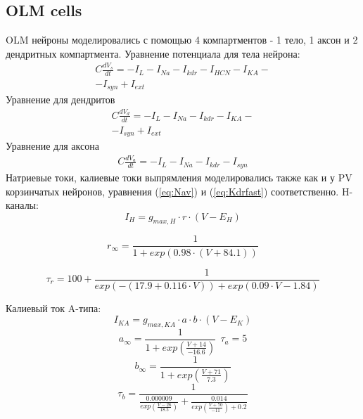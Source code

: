 \documentclass[12pt]{article}
\begin{document}
\subsection{OLM cells}
OLM нейроны моделировались с помощью 4 компартментов - 1 тело, 1 аксон и 2 дендритных компартмента. Уравнение потенциала для тела нейрона:
\begin{eqnarray}
C\frac{dV_s}{dt} = -I_L - I_{Na} - I_{kdr} - I_{HCN} - I_{KA}-
 \nonumber \\
-I_{syn} + I_{ext}
\end{eqnarray}
Уравнение для дендритов
\begin{eqnarray}
C\frac{dV_d}{dt} = -I_L - I_{Na} - I_{kdr} - I_{KA}-
\nonumber \\
-I_{syn} + I_{ext}
\end{eqnarray}
Уравнение для аксона
\begin{eqnarray}
C\frac{dV_a}{dt} = -I_L - I_{Na} - I_{kdr} - I_{syn}
\end{eqnarray}
Натриевые токи, калиевые токи выпрямления моделировались также как и у PV корзинчатых нейронов, уравнения (\ref{eq:Nav}) и (\ref{eq:Kdrfast}) соответственно.
H-каналы:
\begin{equation}
\label{eq:HCNolm}
I_{H} = g_{max, H} \cdot r \cdot (V - E_{H})
\end{equation}

\begin{equation}
r_{\infty} =  \frac{1}{1 + exp(0.98 \cdot(V + 84.1))}
\end{equation}

\begin{equation}
\tau_{r} = 100 + \frac{1}{exp(-(17.9+0.116\cdot V)) + exp(0.09 \cdot V-1.84)   }
\end{equation}

Калиевый ток A-типа:
\begin{equation}
\label{eq:KvAolm}
I_{KA} = g_{max, KA} \cdot a \cdot b \cdot (V - E_K)
\end{equation}
\begin{equation}
a_{\infty} = \frac{1}{1 + exp(\frac{V + 14}{-16.6})  } \ \ \tau_a = 5
\end{equation}
\begin{equation}
b_{\infty} = \frac{1}{1 + exp(\frac{V + 71}{7.3})  }
\end{equation}
\begin{equation}
\tau_b = \frac{1}{\frac{0.000009}{exp(\frac{V - 26}{18.5})}  + \frac{0.014}{exp(\frac{V +70}{-11}) + 0.2} }
\end{equation}
\end{document}

